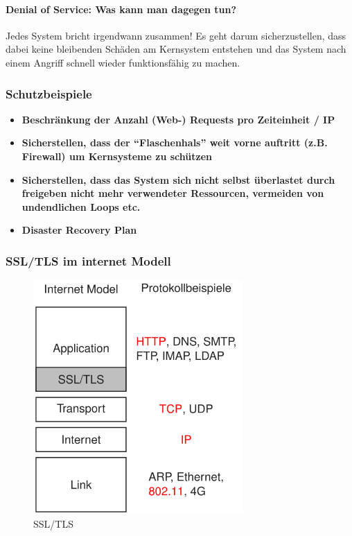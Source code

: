 \documentclass[10pt,a4paper]{article}
\begin{document}
\paragraph*{Denial of Service: Was kann man dagegen tun?} Jedes System bricht irgendwann zusammen! Es geht darum sicherzustellen, dass dabei keine bleibenden Schäden am
Kernsystem entstehen und das System nach einem Angriff schnell wieder funktionsfähig zu machen.

\subsubsection*{Schutzbeispiele}
\begin{itemize}[noitemsep,topsep=0pt,leftmargin=*]
    \item \textbf{Beschränkung der Anzahl (Web-) Requests pro Zeiteinheit / IP }
    \item \textbf{Sicherstellen, dass der "`Flaschenhals"' weit vorne auftritt (z.B. Firewall) um Kernsysteme zu schützen}
    \item \textbf{Sicherstellen, dass das System sich nicht selbst überlastet durch freigeben nicht mehr verwendeter Ressourcen, vermeiden von undendlichen Loops etc.}
    \item \textbf{Disaster Recovery Plan}
\end{itemize}

\subsubsection*{SSL/TLS im internet Modell}
\begin{figure}[H]
    \begin{center}
    \includegraphics[width=8cm]{images/SSL-TLS.png}
    \caption{SSL/TLS}
    \label{SSL/TLS}
    \end{center}
\end{figure}
\end{document}
